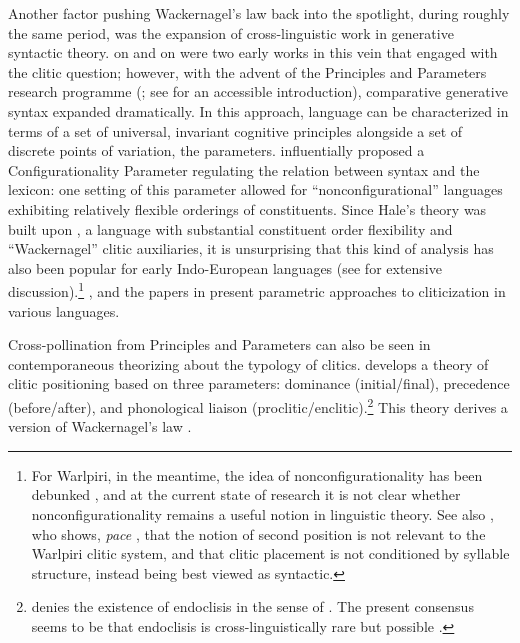 Another factor pushing Wackernagel's law back into the spotlight, during roughly the same period, was the expansion of cross-linguistic work in generative syntactic theory. \citet{Hale1973} on  and \citet{Kayne1975} on  were two early works in this vein that engaged with the clitic question; however, with the advent of the Principles and Parameters research programme (\citealp{Chomsky1981,Chomsky1982,Borer1981,Rizzi1982}; see \citealp{Roberts1997} for an accessible introduction), comparative generative syntax expanded dramatically. In this approach, language can be characterized in terms of a set of universal, invariant cognitive principles alongside a set of discrete points of variation, the parameters. \citet{Hale1983} influentially proposed a Configurationality Parameter regulating the relation between syntax and the lexicon: one setting of this parameter allowed for ``nonconfigurational'' languages exhibiting relatively flexible orderings of constituents. Since Hale's theory was built upon , a language with substantial constituent order flexibility and ``Wackernagel'' clitic auxiliaries, it is unsurprising that this kind of analysis has also been popular for early Indo-European languages (see \citealp{Ledgeway2012} for extensive discussion).\footnote{For Warlpiri, in the meantime, the idea of nonconfigurationality has been debunked \citep{Legate2002}, and at the current state of research it is not clear whether nonconfigurationality remains a useful notion in linguistic theory. See also \citet{Legate2008}, who shows, \textit{pace} \citeauthor{Hale1973}, that the notion of second position is not relevant to the Warlpiri clitic system, and that clitic placement is not conditioned by syllable structure, instead being best viewed as syntactic.} \citet{Borer1981}, \citet{Rivero1986} and the papers in \citet{Borer1986} present parametric approaches to cliticization in various languages.

Cross-pollination from Principles and Parameters can also be seen in contemporaneous theorizing about the typology of clitics. \citet{Klavans1985} develops a theory of clitic positioning based on three parameters: dominance (initial/final), precedence (before/after), and phonological liaison (proclitic/enclitic).\footnote{\citet{Klavans1979,Klavans1985} denies the existence of endoclisis in the sense of \citet{Zwicky1977}. The present consensus seems to be that endoclisis is cross-linguistically rare but possible \citep{Harris2002,Smith2013}.} This theory derives a version of Wackernagel's law \citep[117]{Klavans1985}.

